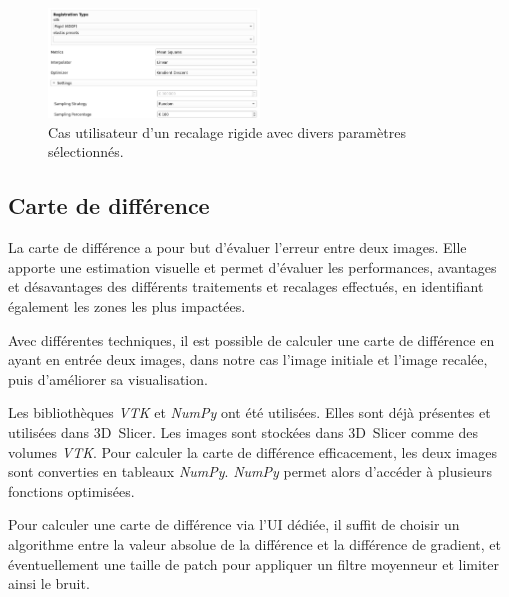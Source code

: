 \documentclass{article}
\begin{document}
{{        \bigskip

        \begin{figure}[!ht]
            \centering
            \includegraphics[width=0.5\textwidth]{images/registration_use_case.png}
            \caption{Cas utilisateur d'un recalage rigide avec divers paramètres sélectionnés.}
            \label{fig:registration_use_case}
        \end{figure}
    }

    {
        \newpage
        \subsection{Carte de différence}
        \label{subsec:difference-map-implementation}

        La carte de différence a pour but d'évaluer l'erreur entre deux images. Elle apporte une estimation visuelle et permet d'évaluer les performances, avantages et désavantages des différents traitements et recalages effectués, en identifiant également les zones les plus impactées.

        Avec différentes techniques, il est possible de calculer une carte de différence en ayant en entrée deux images, dans notre cas l'image initiale et l'image recalée, puis d'améliorer sa visualisation.

        \bigskip

        Les bibliothèques \textit{VTK} et \textit{NumPy} ont été utilisées. Elles sont déjà présentes et utilisées dans 3D~Slicer. Les images sont stockées dans 3D~Slicer comme des volumes \textit{VTK}. Pour calculer la carte de différence efficacement, les deux images sont converties en tableaux \textit{NumPy}. \textit{NumPy} permet alors d'accéder à plusieurs fonctions optimisées.

        \bigskip

        Pour calculer une carte de différence via l'UI dédiée, il suffit de choisir un algorithme entre la valeur absolue de la différence et la différence de gradient, et éventuellement une taille de patch pour appliquer un filtre moyenneur et limiter ainsi le bruit.

}}
\end{document}

